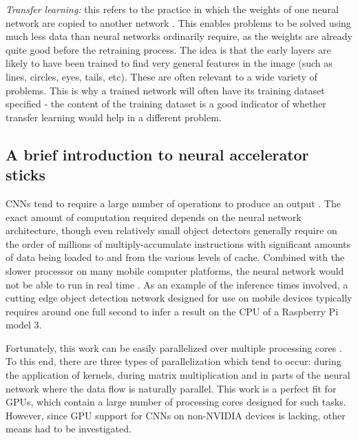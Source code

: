 \textit{Transfer learning:} this refers to the practice in which the weights of one neural network are copied to another network \cite{pan2010survey}. This enables problems to be solved using much less data than neural networks ordinarily require, as the weights are already quite good before the retraining process. The idea is that the early layers are likely to have been trained to find very general features in the image (such as lines, circles, eyes, tails, etc). These are often relevant to a wide variety of problems. This is why a trained network will often have its training dataset specified - the content of the training dataset is a good indicator of whether transfer learning would help in a different problem.




\subsection{A brief introduction to neural accelerator sticks}
CNNs tend to require a large number of operations to produce an output \cite{huang2017speed}. The exact amount of computation required depends on the neural network architecture, though even relatively small object detectors generally require on the order of millions of multiply-accumulate instructions with significant amounts of data being loaded to and from the various levels of cache. Combined with the slower processor on many mobile computer platforms, the neural network would not be able to run in real time \cite{huang2017speed}. As an example of the inference times involved, a cutting edge object detection network designed for use on mobile devices typically requires around one full second to infer a result on the CPU of a Raspberry Pi model 3.

Fortunately, this work can be easily parallelized over multiple processing cores \cite{krizhevsky2014one}. To this end, there are three types of parallelization which tend to occur: during the application of kernels, during matrix multiplication and in parts of the neural network where the data flow is naturally parallel. This work is a perfect fit for GPUs, which contain a large number of processing cores designed for such tasks. However, since GPU support for CNNs on non-NVIDIA devices is lacking, other means had to be investigated.


